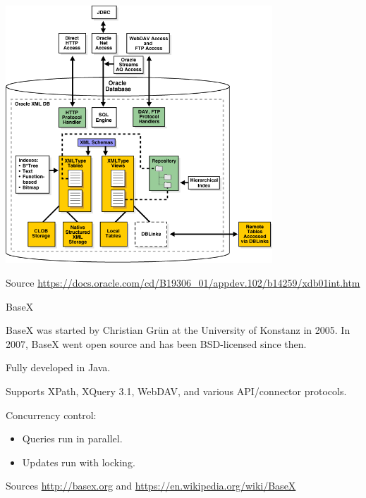 \begin{frame}
\begin{center}
\includegraphics[width=0.75\textwidth]{figures/Oracle_XMLDB2.png}
\end{center}
\footnotesize Source \url{https://docs.oracle.com/cd/B19306_01/appdev.102/b14259/xdb01int.htm}
\end{frame}

\begin{frame}{BaseX}

BaseX was started by Christian Grün at the University of Konstanz in 2005. In 2007, BaseX went open source and has been BSD-licensed since then.

Fully developed in Java.

Supports XPath, XQuery 3.1, WebDAV, and various API/connector protocols.

Concurrency control:
\begin{itemize}[-]
\item Queries run in parallel.
\item Updates run with locking.
\end{itemize}

\footnotesize Sources \url{http://basex.org} and \url{https://en.wikipedia.org/wiki/BaseX}
\end{frame}

